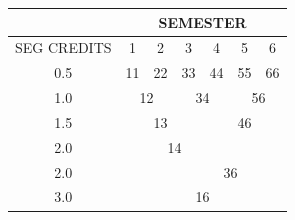 \begin{tabular}{|c|c|c|c|c|c|c|}
    \hline
    & \multicolumn{6}{|c|}{SEMESTER} \\ \hline
    SEG CREDITS & 1 & 2 & 3 & 4 & 5 & 6 \\ \hline
    0.5 & \multicolumn{1}{|c|}{11}& \multicolumn{1}{|c|}{22}& \multicolumn{1}{|c|}{33}& \multicolumn{1}{|c|}{44}& \multicolumn{1}{|c|}{55}& \multicolumn{1}{|c|}{66} \\ \hline
    1.0 &\multicolumn{2}{|c|}{12}& \multicolumn{2}{|c|}{34} & \multicolumn{2}{|c|}{56} \\ \hline
    1.5 &\multicolumn{3}{|c|}{13}& \multicolumn{3}{|c|}{46} \\ \hline
    2.0 &\multicolumn{4}{|c|}{14}& \hspace{2mm} & \hspace{2mm}  \\ \hline
    2.0 & \hspace{2mm} & \hspace{2mm} & \multicolumn{4}{|c|}{36} \\ \hline
    3.0 &\multicolumn{6}{|c|}{16} \\ \hline
\end{tabular}

